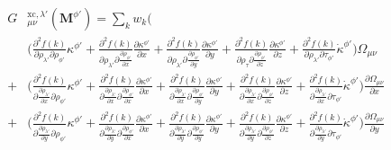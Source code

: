 \documentclass[preprint,preprintnumbers,amsmath,amssymb,11pt]{revtex4}
\def\xc{\textrm{xc}}
\begin{document}
\begin{eqnarray}
&G&^{\xc,\lambda'}_{\mu \nu}( \textbf{M}^{\phi'} )=   \sum_{k} w_{k} \biggl(\\
& \phantom{=} &\biggl( 
\frac{\partial^{2} f(k)}{\partial \rho_{\lambda'} \partial \rho_{\phi'}} \kappa^{\phi'}
+\frac{\partial^{2} f(k)}{\partial \rho_{\lambda'} \partial \frac{\partial \rho_{\phi'}}{\partial x}}\frac{\partial \kappa^{\phi'}}{\partial x}
+\frac{\partial^{2} f(k)}{\partial \rho_{\lambda'} \partial \frac{\partial \rho_{\phi'}}{\partial y}} \frac{\partial \kappa^{\phi'}}{\partial y}
+\frac{\partial^{2} f(k)}{\partial \rho_{\tau} \partial \frac{\partial \rho_{\phi'}}{\partial z}}  \frac{\partial \kappa^{\phi'}}{\partial z}
+ \frac{\partial^{2} f(k)}{\partial \rho_{\lambda'} \partial \tau_{\phi'}} \dot{\kappa}^{\phi'}
\biggr) \Omega_{\mu \nu}\nonumber\\
&+&
\biggl( \frac{\partial^{2} f(k)}{\partial \frac{\partial \rho_{\lambda'}}{\partial x} \partial \rho_{\phi'}} \kappa^{\phi'}
+\frac{\partial^{2} f(k)}{\partial \frac{\partial \rho_{\lambda'}}{\partial x} \partial \frac{\partial \rho_{\phi'}}{\partial x}} \frac{\partial \kappa^{\phi'}}{\partial x}
+\frac{\partial^{2} f(k)}{\partial \frac{\partial \rho_{\lambda'}}{\partial x} \partial \frac{\partial \rho_{\phi'}}{\partial y}} \frac{\partial \kappa^{\phi'}}{\partial y}
+\frac{\partial^{2} f(k)}{\partial \frac{\partial \rho_{\lambda'}}{\partial x} \partial \frac{\partial \rho_{\phi'}}{\partial z}} \frac{\partial \kappa^{\phi'}}{\partial z}
+\frac{\partial^{2} f(k)}{\partial \frac{\partial \rho_{\lambda'}}{\partial x} \partial \tau_{\phi'}} \dot{\kappa}^{\phi'}
\biggr) \frac{\partial \Omega_{\mu \nu}}{\partial x}\nonumber\\
&+&\biggl(
\frac{\partial^{2} f(k)}{\partial \frac{\partial \rho_{\lambda'}}{\partial y} \partial \rho_{\phi'}} \kappa^{\phi'}
+\frac{\partial^{2} f(k)}{\partial \frac{\partial \rho_{\lambda'}}{\partial y} \partial \frac{\partial \rho_{\phi'}}{\partial x}} \frac{\partial \kappa^{\phi'}}{\partial x}
+\frac{\partial^{2} f(k)}{\partial \frac{\partial \rho_{\lambda'}}{\partial y} \partial \frac{\partial \rho_{\phi'}}{\partial y}} \frac{\partial \kappa^{\phi'}}{\partial y}
+\frac{\partial^{2} f(k)}{\partial \frac{\partial \rho_{\lambda'}}{\partial y} \partial \frac{\partial \rho_{\phi'}}{\partial z}} \frac{\partial \kappa^{\phi'}}{\partial z} 
+\frac{\partial^{2} f(k)}{\partial \frac{\partial \rho_{\lambda'}}{\partial y} \partial \tau_{\phi'}} \dot{\kappa}^{\phi'}
\biggr) \frac{\partial \Omega_{\mu \nu}}{\partial y}\nonumber\\

\end{eqnarray}
\end{document}
